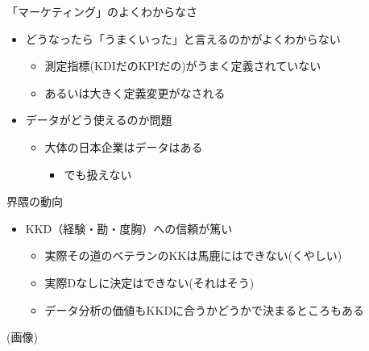 \documentclass[ignorenonframetext,]{beamer}
\providecommand{\tightlist}{%
  \setlength{\itemsep}{0pt}\setlength{\parskip}{0pt}}
\begin{document}
\begin{frame}{「マーケティング」のよくわからなさ}

\begin{itemize}
\tightlist
\item
  どうなったら「うまくいった」と言えるのかがよくわからない

  \begin{itemize}
  \tightlist
  \item
    測定指標(KDIだのKPIだの)がうまく定義されていない
  \item
    あるいは大きく定義変更がなされる
  \end{itemize}
\item
  データがどう使えるのか問題

  \begin{itemize}
  \tightlist
  \item
    大体の日本企業はデータはある

    \begin{itemize}
    \tightlist
    \item
      でも扱えない
    \end{itemize}
  \end{itemize}
\end{itemize}

\end{frame}

\begin{frame}{界隈の動向}

\begin{itemize}
\tightlist
\item
  KKD（経験・勘・度胸）への信頼が篤い

  \begin{itemize}
  \tightlist
  \item
    実際その道のベテランのKKは馬鹿にはできない(くやしい)
  \item
    実際Dなしに決定はできない(それはそう)
  \item
    データ分析の価値もKKDに合うかどうかで決まるところもある
  \end{itemize}
\end{itemize}

\end{frame}

\begin{frame}{(画像)}

\end{frame}
\end{document}
